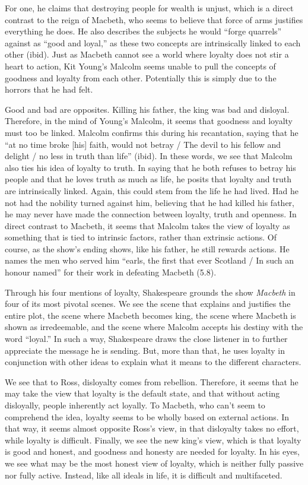 \documentclass[12pt]{article}[titlepage]
\newcommand{\say}[1]{``#1''}
\newcommand{\1}{\={a}}
\newcommand{\2}{\={e}}
\newcommand{\3}{\={\i}}
\newcommand{\4}{\=o}
\newcommand{\5}{\=u}
\newcommand{\6}{\={A}}
\renewcommand{\,}{\textsuperscript{,}}
\begin{document}
For one, he claims that destroying people for wealth is unjust, which is a direct contrast to the reign of Macbeth, who seems to believe that force of arms justifies everything he does.
He also describes the subjects he would \say{forge quarrels} against as \say{good and loyal,} as these two concepts are intrinsically linked to each other (ibid).
Just as Macbeth cannot see a world where loyalty does not stir a heart to action, Kit Young's Malcolm seems unable to pull the concepts of goodness and loyalty from each other.
Potentially this is simply due to the horrors that he had felt.

Good and bad are opposites.
Killing his father, the king was bad and disloyal.
Therefore, in the mind of Young's Malcolm, it seems that goodness and loyalty must too be linked.
Malcolm confirms this during his recantation, saying that he \say{at no time broke [his] faith, would not betray / The devil to his fellow and delight / no less in truth than life} (ibid).
In these words, we see that Malcolm also ties his idea of loyalty to truth.
In saying that he both refuses to betray his people and that he loves truth as much as life, he posits that loyalty and truth are intrinsically linked.
Again, this could stem from the life he had lived.
Had he not had the nobility turned against him, believing that he had killed his father, he may never have made the connection between loyalty, truth and openness.
In direct contrast to Macbeth, it seems that Malcolm takes the view of loyalty as something that is tied to intrinsic factors, rather than extrinsic actions.
Of course, as the show's ending shows, like his father, he still rewards actions.
He names the men who served him \say{earls, the first that ever Scotland / In such an honour named} for their work in defeating Macbeth (5.8).

Through his four mentions of loyalty, Shakespeare grounds the show \textit{Macbeth} in four of its most pivotal scenes.
We see the scene that explains and justifies the entire plot, the scene where Macbeth becomes king, the scene where Macbeth is shown as irredeemable, and the scene where Malcolm accepts his destiny with the word \say{loyal.}
In such a way, Shakespeare draws the close listener in to further appreciate the message he is sending.
But, more than that, he uses loyalty in conjunction with other ideas to explain what it means to the different characters.

We see that to Ross, disloyalty comes from rebellion.
Therefore, it seems that he may take the view that loyalty is the default state, and that without acting disloyally, people inherently act loyally.
To Macbeth, who can't seem to comprehend the idea, loyalty seems to be wholly based on external actions.
In that way, it seems almost opposite Ross's view, in that disloyalty takes no effort, while loyalty is difficult.
Finally, we see the new king's view, which is that loyalty is good and honest, and goodness and honesty are needed for loyalty.
In his eyes, we see what may be the most honest view of loyalty, which is neither fully passive nor fully active.
Instead, like all ideals in life, it is difficult and multifaceted.
\end{document}
